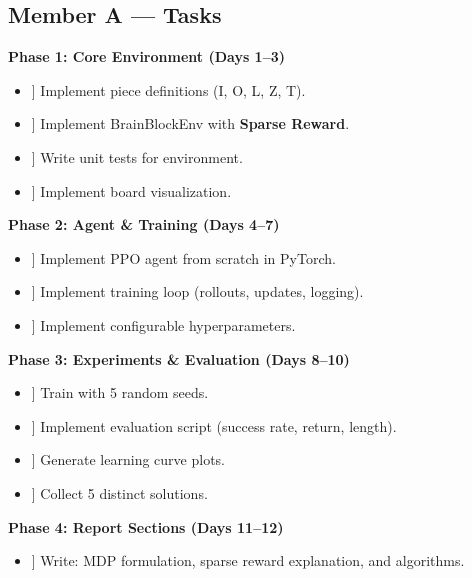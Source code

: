 \documentclass[11pt,a4paper]{article}
\begin{document}
\subsection{Member A — Tasks}
\textbf{Phase 1: Core Environment (Days 1--3)}
\begin{itemize}
    \item[ [ ] ] Implement piece definitions (I, O, L, Z, T).
    \item[ [ ] ] Implement BrainBlockEnv with \textbf{Sparse Reward}.
    \item[ [ ] ] Write unit tests for environment.
    \item[ [ ] ] Implement board visualization.
\end{itemize}
\textbf{Phase 2: Agent \& Training (Days 4--7)}
\begin{itemize}
    \item[ [ ] ] Implement PPO agent from scratch in PyTorch.
    \item[ [ ] ] Implement training loop (rollouts, updates, logging).
    \item[ [ ] ] Implement configurable hyperparameters.
\end{itemize}
\textbf{Phase 3: Experiments \& Evaluation (Days 8--10)}
\begin{itemize}
    \item[ [ ] ] Train with 5 random seeds.
    \item[ [ ] ] Implement evaluation script (success rate, return, length).
    \item[ [ ] ] Generate learning curve plots.
    \item[ [ ] ] Collect 5 distinct solutions.
\end{itemize}
\textbf{Phase 4: Report Sections (Days 11--12)}
\begin{itemize}
    \item[ [ ] ] Write: MDP formulation, sparse reward explanation, and algorithms.
\end{itemize}
\end{document}
